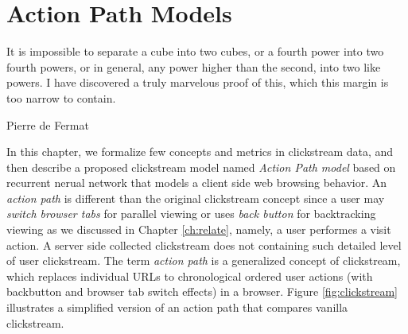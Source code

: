 \section{Action Path Models}
\label{ch:model}

\epigraph{It is impossible to separate a cube into two cubes, or a fourth power into two fourth powers, or in general, any power higher than the second, into two like powers. I have discovered a truly marvelous proof of this, which this margin is too narrow to contain.}{Pierre de Fermat}

In this chapter, we formalize few concepts and metrics in clickstream data,
and then describe a proposed clickstream model named \emph{Action Path model} 
based on recurrent nerual network that models a client side web browsing behavior. 
An \emph{action path} is different than the original clickstream concept since 
a user may \emph{switch browser tabs} for parallel viewing \cite{huang2010parallel} or uses \emph{back button} 
for backtracking viewing \cite{huang2012no} as we discussed in Chapter \ref{ch:relate}, 
namely, a user performes a visit action.
A server side collected clickstream does not containing such detailed level of 
user clickstream.
The term \emph{action path} is a generalized concept of clickstream, 
which replaces individual URLs to chronological ordered user actions 
(with backbutton and browser tab switch effects) in a browser.
Figure \ref{fig:clickstream} illustrates a simplified version of an action path that 
compares vanilla clickstream.

